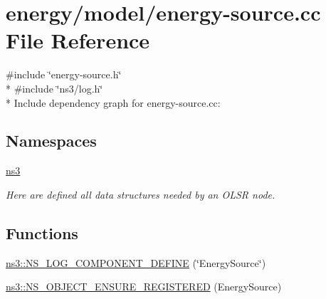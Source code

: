 \hypertarget{energy-source_8cc}{}\section{energy/model/energy-\/source.cc File Reference}
\label{energy-source_8cc}
{\ttfamily \#include \char`\"{}energy-\/source.\+h\char`\"{}}\\*
{\ttfamily \#include \char`\"{}ns3/log.\+h\char`\"{}}\\*
Include dependency graph for energy-\/source.cc\+:
\subsection*{Namespaces}
\begin{DoxyCompactItemize}
\item 
 \hyperlink{namespacens3}{ns3}
\begin{DoxyCompactList}\small\item\em Here are defined all data structures needed by an O\+L\+SR node. \end{DoxyCompactList}\end{DoxyCompactItemize}
\subsection*{Functions}
\begin{DoxyCompactItemize}
\item 
\hyperlink{namespacens3_a8a26c5f1503d7b2669e5534d9d612b1e}{ns3\+::\+N\+S\+\_\+\+L\+O\+G\+\_\+\+C\+O\+M\+P\+O\+N\+E\+N\+T\+\_\+\+D\+E\+F\+I\+NE} (\char`\"{}Energy\+Source\char`\"{})
\item 
\hyperlink{namespacens3_a2cb7928a4796a1a25e02f32f379c27ef}{ns3\+::\+N\+S\+\_\+\+O\+B\+J\+E\+C\+T\+\_\+\+E\+N\+S\+U\+R\+E\+\_\+\+R\+E\+G\+I\+S\+T\+E\+R\+ED} (Energy\+Source)
\end{DoxyCompactItemize}
